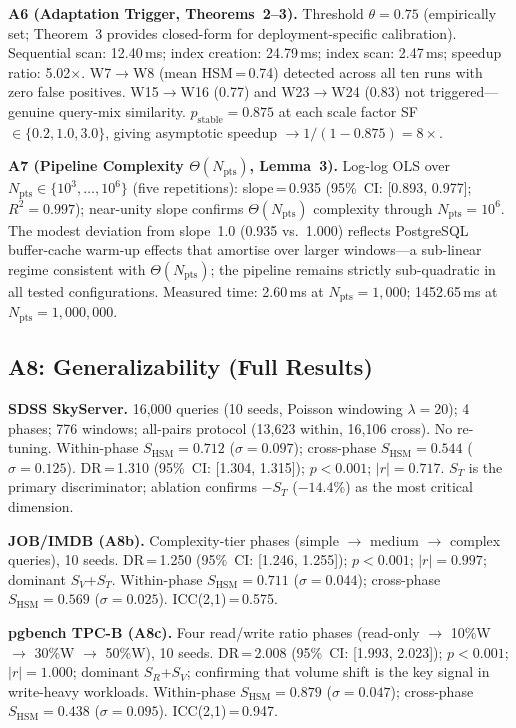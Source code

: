\documentclass[10pt,twocolumn,a4paper]{article}
\newcommand{\SHSM}{S_{\mathrm{HSM}}}
\newcommand{\SR}{S_{R}}
\newcommand{\SV}{S_{V}}
\newcommand{\ST}{S_{T}}
\newcommand{\Npts}{N_{\mathrm{pts}}}
\begin{document}
\textbf{A6 (Adaptation Trigger, Theorems~2--3).} Threshold $\theta\!=\!0.75$
(empirically set; Theorem~3 provides closed-form for deployment-specific
calibration). Sequential scan: 12.40\,ms; index creation: 24.79\,ms;
index scan: 2.47\,ms; speedup ratio: 5.02$\times$. W7$\to$W8 (mean
HSM\,=\,0.74) detected across all ten runs with zero false positives.
W15$\to$W16 (0.77) and W23$\to$W24 (0.83) not triggered---genuine
query-mix similarity. $p_{\mathrm{stable}}\!=\!0.875$ at each scale
factor SF\,$\in\{0.2,1.0,3.0\}$, giving asymptotic speedup
$\to\!1/(1-0.875)\!=\!8\times$.

\textbf{A7 (Pipeline Complexity $\Theta(\Npts)$, Lemma~3).} Log-log OLS over
$\Npts\!\in\!\{10^3,\ldots,10^6\}$ (five repetitions): slope\,=\,0.935
(95\%~CI: [0.893, 0.977]; $R^2\!=\!0.997$); near-unity slope confirms
$\Theta(\Npts)$ complexity through $\Npts\!=\!10^6$. The modest deviation
from slope~1.0 (0.935 vs.\ 1.000) reflects PostgreSQL buffer-cache
warm-up effects that amortise over larger windows---a sub-linear regime
consistent with $\Theta(\Npts)$; the pipeline remains strictly
sub-quadratic in all tested configurations. Measured time:
2.60\,ms at $\Npts\!=\!1{,}000$; 1452.65\,ms at $\Npts\!=\!1{,}000{,}000$.

\subsection{A8: Generalizability (Full Results)}

\textbf{SDSS SkyServer.} 16{,}000 queries
(10 seeds, Poisson windowing $\lambda\!=\!20$); 4 phases; 776 windows;
all-pairs protocol (13{,}623 within, 16{,}106 cross). No re-tuning.
Within-phase $\SHSM\!=\!0.712$ ($\sigma\!=\!0.097$);
cross-phase $\SHSM\!=\!0.544$ ($\sigma\!=\!0.125$).
DR\,=\,1.310 (95\%~CI: [1.304, 1.315]);
$p\!<\!0.001$; $|r|\!=\!0.717$.
$\ST$ is the primary discriminator;
ablation confirms $-\ST$ ($-14.4\%$) as the most critical dimension.

\textbf{JOB/IMDB (A8b).} Complexity-tier phases (simple $\to$ medium $\to$
complex queries), 10 seeds. DR\,=\,1.250 (95\%~CI: [1.246, 1.255]);
$p\!<\!0.001$; $|r|\!=\!0.997$; dominant $\SV$+$\ST$.
Within-phase $\SHSM\!=\!0.711$ ($\sigma\!=\!0.044$);
cross-phase $\SHSM\!=\!0.569$ ($\sigma\!=\!0.025$).
ICC(2,1)\,=\,0.575.

\textbf{pgbench TPC-B (A8c).} Four read/write ratio phases (read-only
$\to$ 10\%W $\to$ 30\%W $\to$ 50\%W), 10 seeds. DR\,=\,2.008
(95\%~CI: [1.993, 2.023]); $p\!<\!0.001$; $|r|\!=\!1.000$; dominant $\SR$+$\SV$;
confirming that volume shift is the key signal in write-heavy workloads.
Within-phase $\SHSM\!=\!0.879$ ($\sigma\!=\!0.047$);
cross-phase $\SHSM\!=\!0.438$ ($\sigma\!=\!0.095$).
ICC(2,1)\,=\,0.947.
\end{document}
